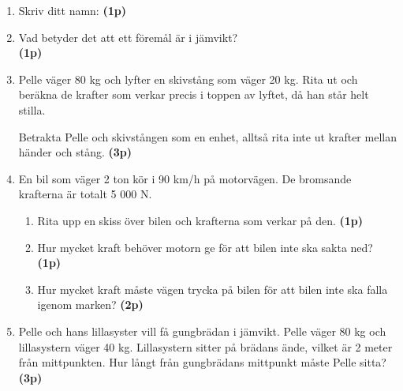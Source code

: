 \documentclass[11pt]{article}
\begin{document}
\begin{enumerate}[itemsep=0.5em]
        \item
              Skriv ditt namn: \underline{\hspace{5cm}} \textbf{(1p)}

        \item
              Vad betyder det att ett föremål är i jämvikt? \hrulefill{} \\
              \vspace{1em}
              \hrulefill{} \textbf{(1p)}

        \item
              \begin{minipage}[t]{0.6\textwidth}
                      Pelle väger 80 kg och lyfter en skivstång som väger 20 kg. Rita ut och beräkna de
                      krafter som verkar precis i toppen av lyftet, då han står helt stilla.

                      Betrakta Pelle och skivstången som en enhet, alltså rita inte ut krafter mellan händer och stång. \textbf{(3p)}
              \end{minipage}
              \hspace{2em}
              \begin{adjustbox}{valign=t}
                      
              \end{adjustbox}
        \item
              En bil som väger 2 ton kör i 90 km/h på motorvägen. De bromsande krafterna är totalt 5 000 N.
              \begin{enumerate}[label=\alph*)]
                      \item
                            Rita upp en skiss över bilen och krafterna som verkar på den. \textbf{(1p)}
                      \item
                            Hur mycket kraft behöver motorn ge för att bilen inte ska sakta ned? \textbf{(1p)}
                      \item
                            Hur mycket kraft måste vägen trycka på bilen för att bilen inte ska falla igenom marken? \textbf{(2p)}
              \end{enumerate}

        \item
              Pelle och hans lillasyster vill få gungbrädan i jämvikt. Pelle väger 80 kg och lillasystern väger 40 kg. Lillasystern sitter på brädans ände, vilket är 2 meter från mittpunkten. Hur långt från gungbrädans mittpunkt måste Pelle sitta? \textbf{(3p)}
              \begin{center}
                      
              \end{center}


\end{enumerate}
\end{document}
